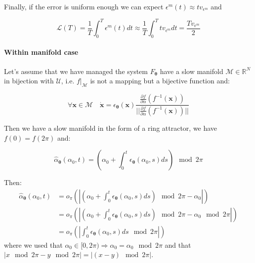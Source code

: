 \documentclass{article} %
\newcounter{ct}
\newcommand{\manifold}{\mathcal{M}}
\theoremstyle{definition}
\theoremstyle{remark}
\begin{document}
Finally, if the error is uniform enough we can expect \(\epsilon^{m}(t) \approx tv_{\epsilon^m}\) and

\begin{equation}
    \mathcal{L}(T) = \frac{1}{T} \int_0^{T} \epsilon^{m}(t) dt \approx  \frac{1}{T} \int_0^{T} t v_{\epsilon^m}dt = \frac{T v_{\epsilon^m}}{2}
\end{equation}

\paragraph{Within manifold case}
Let's assume that we have managed the system \(F_{\boldsymbol{\theta}}\)  have a slow manifold \(\manifold \in \mathbb{R}^N\) in bijection with \(\mathcal{U}\), i.e. \(f|_{\manifold}\) is not a mapping but a bijective function and:

\begin{equation}
\forall \bm{x} \in \manifold \quad \dot{\bm{x}} = \epsilon_{\bm{\theta}}(\bm{x})\frac{\frac{\partial f}{\partial \alpha}(f^{-1}(\bm{x}))}{||\frac{\partial f}{\partial \alpha}(f^{-1}(\bm{x}))||}
\end{equation}


Then we have a slow manifold in the form of a ring attractor, we have \(f(0) = f(2 \pi)\) and:

\begin{equation}
    \hat{\alpha}_{\boldsymbol{\theta}}(\alpha_0, t) = \left(\alpha_0 + \int_0^t \epsilon_{\bm{\theta}}(\alpha_0, s) ds \right)\mod 2 \pi
\end{equation}


Then:
\begin{equation}
\begin{split}
    \hat{\alpha}_{\boldsymbol{\theta}}(\alpha_0, t) &= o_\pi \left( \left| \left(\alpha_0 + \int_0^t \epsilon_{\bm{\theta}}(\alpha_0, s) ds \right)\mod 2 \pi - \alpha_0 \right| \right)  \\
    &= o_\pi \left( \left| \left(\alpha_0 + \int_0^t \epsilon_{\bm{\theta}}(\alpha_0, s) ds \right)\mod 2 \pi - \alpha_0 \mod 2 \pi \right| \right) \\
    &= o_\pi \left( \left| \int_0^t \epsilon_{\bm{\theta}}(\alpha_0, s) ds \mod 2 \pi \right| \right)
\end{split}
\end{equation}
where we used that \(\alpha_0 \in [0,2 \pi) \Rightarrow \alpha_0 = \alpha_0 \mod 2 \pi\) and that \(|x \mod 2 \pi - y \mod 2 \pi| = |(x-y) \mod 2 \pi|\). %
\end{document}

